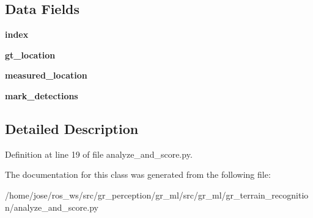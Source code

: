 \subsection*{Data Fields}
\begin{DoxyCompactItemize}
\item 
\mbox{\label{classgr__ml_1_1gr__terrain__recognition_1_1analyze__and__score_1_1DetectionsScore_a5dcd691310b92d709b59e28cc456ceb1}} 
{\bfseries index}
\item 
\mbox{\label{classgr__ml_1_1gr__terrain__recognition_1_1analyze__and__score_1_1DetectionsScore_a536accea80868c2445d67320278e2fbc}} 
{\bfseries gt\+\_\+location}
\item 
\mbox{\label{classgr__ml_1_1gr__terrain__recognition_1_1analyze__and__score_1_1DetectionsScore_a490cf9a9ccb67269a331f89683e871a4}} 
{\bfseries measured\+\_\+location}
\item 
\mbox{\label{classgr__ml_1_1gr__terrain__recognition_1_1analyze__and__score_1_1DetectionsScore_a79de0eadf241c39460d3e8035bcb945a}} 
{\bfseries mark\+\_\+detections}
\end{DoxyCompactItemize}


\subsection{Detailed Description}


Definition at line 19 of file analyze\+\_\+and\+\_\+score.\+py.



The documentation for this class was generated from the following file\+:\begin{DoxyCompactItemize}
\item 
/home/jose/ros\+\_\+ws/src/gr\+\_\+perception/gr\+\_\+ml/src/gr\+\_\+ml/gr\+\_\+terrain\+\_\+recognition/analyze\+\_\+and\+\_\+score.\+py\end{DoxyCompactItemize}
